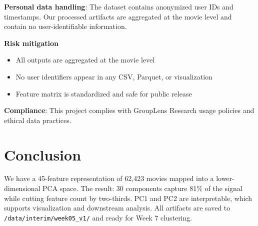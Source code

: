 \documentclass[11pt]{article}
\begin{document}
\textbf{Personal data handling}: The dataset contains anonymized user IDs and timestamps. Our processed artifacts are aggregated at the movie level and contain no user-identifiable information.

\textbf{Risk mitigation}

\begin{itemize}[leftmargin=1.5em]
    \item All outputs are aggregated at the movie level
    \item No user identifiers appear in any CSV, Parquet, or visualization
    \item Feature matrix is standardized and safe for public release
\end{itemize}

\textbf{Compliance}: This project complies with GroupLens Research usage policies and ethical data practices.

\section{Conclusion}

We have a 45-feature representation of 62,423 movies mapped into a lower-dimensional PCA space. The result: 30 components capture 81\% of the signal while cutting feature count by two-thirds. PC1 and PC2 are interpretable, which supports visualization and downstream analysis. All artifacts are saved to \texttt{/data/interim/week05\_v1/} and ready for Week 7 clustering.
\end{document}

